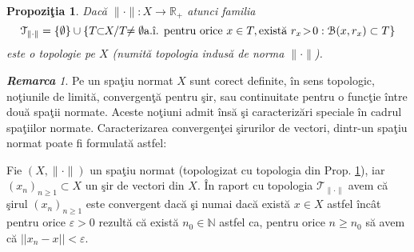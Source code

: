 \documentclass[ a4paper, 12pt]{report}
\newtheorem{prop}[theorem]{\bf Propozi\c tia }
\theoremstyle{definition}
\theoremstyle{remark}
\newtheorem{remarc}{\bf Remarca}[section]
\numberwithin{equation}{section}
\begin{document}
\begin{prop}\label{top}
Dac\u a $\lVert \cdot \rVert : X \rightarrow \mathbb{R}_{+}$ atunci familia
\[\mathcal{T}_{\lVert \cdot \rVert} = \{\emptyset\} \cup \{T \!\!\subset\!\! X / T \!\!\not= \emptyset \hbox{a.\^ i. pentru orice }  x \in T, \hbox{exist\u a } r_x\! > \!0 : \mathcal{B}(x,r_x) \subset T \}\] este o topologie pe $X$ (numit\u a topologia indus\u a de norma $\lVert \cdot \rVert$).
\end{prop}
\begin{remarc}
Pe un spa\c tiu normat $X$ sunt corect definite, \^in sens topologic, no\c tiunile de limit\u a, convergen\c t\u a pentru \c sir, sau continuitate pentru o func\c tie \^intre dou\u a spa\c tii normate.
Aceste no\c tiuni admit \^ins\u a \c si caracteriz\u ari speciale \^in cadrul spa\c tiilor normate.
Caracterizarea convergen\c tei \c sirurilor de vectori, dintr-un spa\c tiu normat poate fi formulat\u a astfel:

Fie $(X,\lVert \cdot \rVert)$ un spa\c tiu normat (topologizat cu topologia din Prop. \ref{top}), iar $(x_n)_{n \geq 1} \subset X$ un \c sir de vectori din $X$.
\^In raport cu topologia $\mathcal{T}_{\lVert \cdot \rVert}$ avem c\u a \c sirul $(x_n)_{n \geq 1}$ este convergent dac\u a \c si numai dac\u a
exist\u a $x \in X$ astfel \^inc\^at pentru orice $\varepsilon > 0$ rezult\u a c\u  a exist\u a $n_0 \in \mathbb{N}$ astfel ca, pentru orice $n\geq n_0$ s\u a avem c\u a $||x_n - x|| < \varepsilon$.
\end{remarc}
\end{document}
